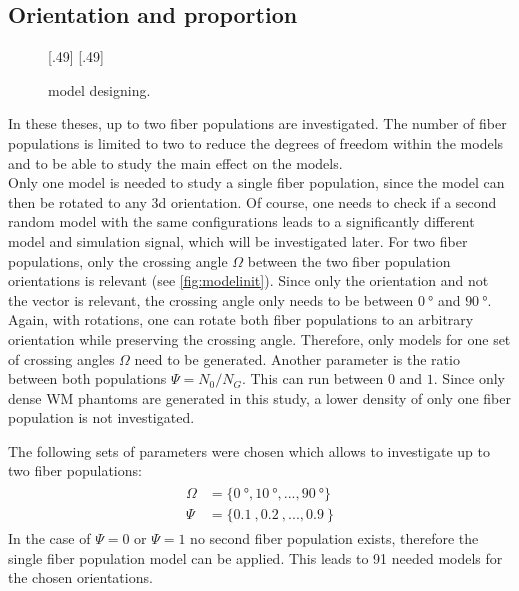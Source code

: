 \subsection{Orientation and proportion}
% 
\begin{figure}[t]
\centering
\def\tikzwidth{0.42*\textwidth}
[.49\textwidth]{\hfill{}\hfill}\hfill
{}
[.49\textwidth]{\hfill{}\hfill}
\\
\caption{model designing.}
\label{fig:twomodelpopdesign}
\end{figure}
% 
In these theses, up to two fiber populations are investigated.
The number of fiber populations is limited to two to reduce the degrees of freedom within the models and to be able to study the main effect on the models.
\\
% 
Only one model is needed to study a single fiber population, since the model can then be rotated to any 3d orientation.
Of course, one needs to check if a second random model with the same configurations leads to a significantly different model and simulation signal, which will be investigated later.
For two fiber populations, only the crossing angle $\Omega$ between the two fiber population orientations is relevant (see \cref{fig:modelinit}).
Since only the orientation and not the vector is relevant, the crossing angle only needs to be between $\SI{0}{\degree}$ and $\SI{90}{\degree}$.
Again, with rotations, one can rotate both fiber populations to an arbitrary orientation while preserving the crossing angle.
Therefore, only models for one set of crossing angles $\Omega$ need to be generated.
Another parameter is the ratio between both populations $\Psi=N_0/N_G$.
This can run between $0$ and $1$.
Since only dense \ac{WM} phantoms are generated in this study, a lower density of only one fiber population is not investigated.
\par
% 
The following sets of parameters were chosen which allows to investigate up to two fiber populations:
\begin{align}
    \begin{split}
        \Omega &= \{\SI{0}{\degree}, \SI{10}{\degree}, ..., \SI{90}{\degree}\}\\
        \Psi &= \{\SI{0.1}{}, \SI{0.2}{}, ..., \SI{0.9}{}\}
    \end{split}
\end{align}
In the case of $\Psi = 0$ or $\Psi = 1$ no second fiber population exists, therefore the single fiber population model can be applied.
This leads to 91 needed models for the chosen orientations.
% 
